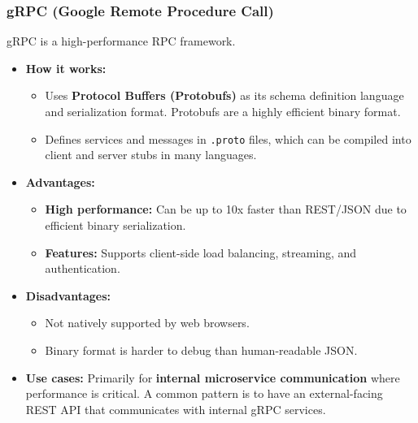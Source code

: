 \documentclass{article}
\begin{document}
\subsubsection{gRPC (Google Remote Procedure Call)}
gRPC is a high-performance RPC framework.
\begin{itemize}
    \item \textbf{How it works:}
    \begin{itemize}
        \item Uses \textbf{Protocol Buffers (Protobufs)} as its schema definition language and serialization format. Protobufs are a highly efficient binary format.
        \item Defines services and messages in \texttt{.proto} files, which can be compiled into client and server stubs in many languages.
    \end{itemize}
    \item \textbf{Advantages:}
    \begin{itemize}
        \item \textbf{High performance:} Can be up to 10x faster than REST/JSON due to efficient binary serialization.
        \item \textbf{Features:} Supports client-side load balancing, streaming, and authentication.
    \end{itemize}
    \item \textbf{Disadvantages:}
    \begin{itemize}
        \item Not natively supported by web browsers.
        \item Binary format is harder to debug than human-readable JSON.
    \end{itemize}
    \item \textbf{Use cases:} Primarily for \textbf{internal microservice communication} where performance is critical. A common pattern is to have an external-facing REST API that communicates with internal gRPC services.
\end{itemize}
\end{document}

